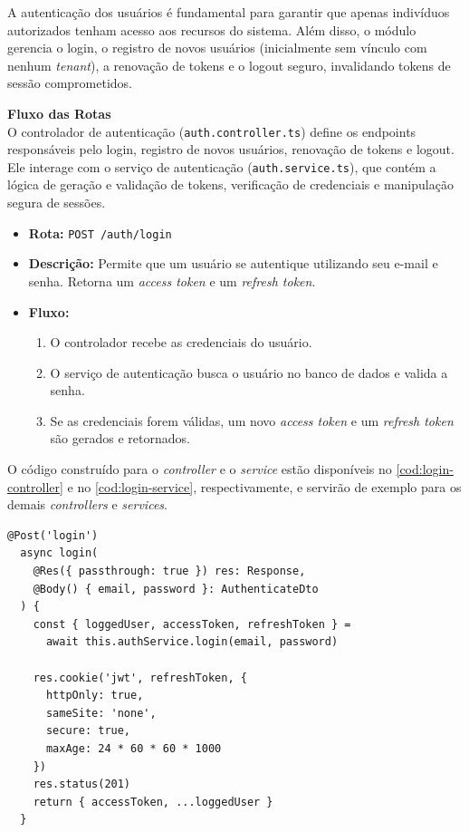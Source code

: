 A autenticação dos usuários é fundamental para garantir que apenas indivíduos autorizados tenham acesso aos recursos do sistema. Além disso, o módulo gerencia o login, o registro de novos usuários (inicialmente sem vínculo com nenhum \textit{tenant}), a renovação de tokens e o logout seguro, invalidando tokens de sessão comprometidos.

\textbf{Fluxo das Rotas}\\
O controlador de autenticação (\texttt{auth.controller.ts}) define os endpoints responsáveis pelo login, registro de novos usuários, renovação de tokens e logout. Ele interage com o serviço de autenticação (\texttt{auth.service.ts}), que contém a lógica de geração e validação de tokens, verificação de credenciais e manipulação segura de sessões.

\begin{itemize}
	\item \textbf{Rota:} \texttt{POST /auth/login}
	\item \textbf{Descrição:} Permite que um usuário se autentique utilizando seu e-mail e senha. Retorna um \textit{access token} e um \textit{refresh token}.
	\item \textbf{Fluxo:}
	\begin{enumerate}
		\item O controlador recebe as credenciais do usuário.
		\item O serviço de autenticação busca o usuário no banco de dados e valida a senha.
		\item Se as credenciais forem válidas, um novo \textit{access token} e um \textit{refresh token} são gerados e retornados.
	\end{enumerate}
\end{itemize}

O código construído para o \textit{controller} e  o \textit{service} estão disponíveis no \autoref{cod:login-controller} e  no \autoref{cod:login-service}, respectivamente, e servirão de exemplo para os demais \textit{controllers} e \textit{services}.

\begin{lstlisting}[caption={Exemplo de \textit{controller} para \textit{login}.},label={cod:login-controller}]
	@Post('login')
  async login(
    @Res({ passthrough: true }) res: Response,
    @Body() { email, password }: AuthenticateDto
  ) {
    const { loggedUser, accessToken, refreshToken } =
      await this.authService.login(email, password)

    res.cookie('jwt', refreshToken, {
      httpOnly: true,
      sameSite: 'none',
      secure: true,
      maxAge: 24 * 60 * 60 * 1000
    })
    res.status(201)
    return { accessToken, ...loggedUser }
  }
\end{lstlisting}

